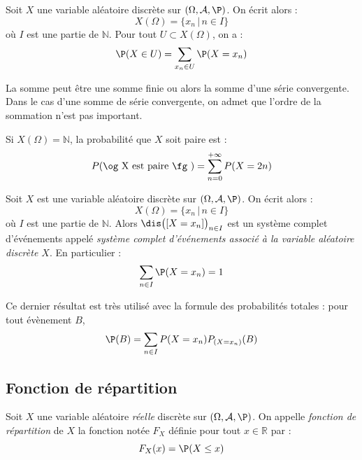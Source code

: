 \documentclass[a4paper,10pt]{report}
\begin{document}
\begin{prop} Soit $X$ une variable aléatoire discrète sur $(\Omega, \mathcal{A}, \P)$. On écrit alors :
$$ X(\Omega)= \lbrace x_n \, \vert \, n \in I \rbrace$$
où $I$ est une partie de $\mathbb{N}$. Pour tout $U \subset X(\Omega)$, on a :
$$ \P(X \in U) = \sum_{x_n \in U} \P(X=x_n)$$
\end{prop}

\begin{rem} La somme peut être une somme finie ou alors la somme d'une série convergente. Dans le cas d'une somme de série convergente, on admet que l'ordre de la sommation n'est pas important.
\end{rem}

\begin{preuve} 

\vspace{3cm}
\end{preuve}

\begin{ex} Si $X(\Omega) = \mathbb{N}$, la probabilité que $X$ soit paire est :
$$ P(\hbox{\og X est paire \fg }) = \sum_{n=0}^{+ \infty} P(X=2n)$$
\end{ex}

\begin{cor} Soit $X$ est une variable aléatoire discrète sur $(\Omega, \mathcal{A}, \P)$.  On écrit alors :
$$ X(\Omega)= \lbrace x_n \, \vert \, n \in I \rbrace$$
où $I$ est une partie de $\mathbb{N}$. Alors $\dis \big([X=x_n]\big)_{n \in I}$  est un système complet d'événements appelé \textit{système complet d'événements associé à la variable aléatoire discrète $X$}. En particulier :
$$\sum_{n \in I} \P(X=x_n) = 1$$
\end{cor}

\medskip

\noindent Ce dernier résultat est très utilisé avec la formule des probabilités totales : pour tout évènement $B$,
$$ \P(B) = \sum_{n \in I} P(X=x_n) P_{(X=x_n)}(B)$$

\subsection{Fonction de répartition}


\begin{defin}
Soit $X$ une variable aléatoire \textit{réelle} discrète sur $(\Omega, \mathcal{A}, \P)$. On appelle \textit{fonction de répartition} de $X$ la fonction notée $F_X$ définie pour tout $x \in \mathbb{R}$ par :
$$F_X(x) = \P(X \leq x) $$
\end{defin}
\end{document}
